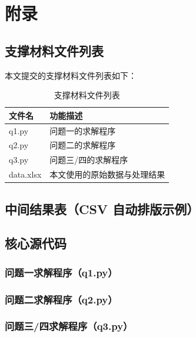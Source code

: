
\clearpage
{}
{}
\section*{附录}

\subsection*{支撑材料文件列表}
本文提交的支撑材料文件列表如下：

\begin{table}[H]
  \centering
  \caption{支撑材料文件列表}
  \label{tab:filelist}
  \begin{tabularx}{\textwidth}{@{}>{\centering}p{4cm}>{\centering\arraybackslash}X@{}}
    \toprule
    文件名 & 功能描述 \\
    \midrule
    q1.py & 问题一的求解程序 \\
    q2.py & 问题二的求解程序 \\
    q3.py & 问题三/四的求解程序 \\
    data.xlsx & 本文使用的原始数据与处理结果 \\
    \bottomrule
  \end{tabularx}
\end{table}

\subsection*{中间结果表（CSV 自动排版示例）}

\subsection*{核心源代码}

\subsubsection*{问题一求解程序（q1.py）}


\subsubsection*{问题二求解程序（q2.py）}


\subsubsection*{问题三/四求解程序（q3.py）}


